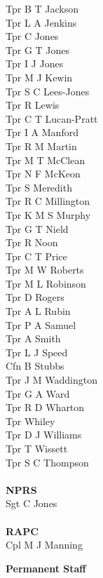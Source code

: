 \begin{multicols}{3}
  Tpr B T Jackson \\
  Tpr L A Jenkins \\
  Tpr C Jones \\
  Tpr G T Jones \\
  Tpr I J Jones \\
  Tpr M J Kewin \\
  Tpr S C Lees-Jones \\
  Tpr R Lewis \\
  Tpr C T Lucan-Pratt \\
  Tpr I A Manford \\
  Tpr R M Martin \\
  Tpr M T McClean \\
  Tpr N F McKeon \\
  Tpr S Meredith \\
  Tpr R C Millington \\
  Tpr K M S Murphy \\
  Tpr G T Nield \\
  Tpr R Noon \\
  Tpr C T Price \\
  Tpr M W Roberts \\
  Tpr M L Robinson \\
  Tpr D Rogers \\
  Tpr A L Rubin \\
  Tpr P A Samuel \\
  Tpr A Smith \\
  Tpr L J Speed \\
  Cfn B Stubbs \\
  Tpr J M Waddington \\
  Tpr G A Ward \\
  Tpr R D Wharton \\
  Tpr Whiley \\
  Tpr D J Williams \\
  Tpr T Wissett \\
  Tpr S C Thompson \\
  \\
  \textbf{NPRS} \\
  Sgt C Jones \\
  \\
  \textbf{RAPC} \\
  Cpl M J Manning \\
\end{multicols}

\vspace*{10mm}

\begin{center}
  \Large
  \textbf{Permanent Staff}
\end{center}

